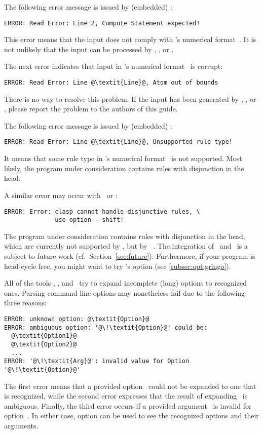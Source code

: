 The following error message is issued by (embedded) \clasp:
%
\begin{lstlisting}[numbers=none,escapechar=@]
ERROR: Read Error: Line 2, Compute Statement expected!
\end{lstlisting}
%
This error means that the input does not comply with \lparse's
numerical format~\cite{lparseManual}.
It is not unlikely that the input can be processed
by \gringo, \clingo, or \iclingo.

The next error indicates that input in
\lparse's numerical format~\cite{lparseManual} is corrupt:
%
\begin{lstlisting}[numbers=none,escapechar=@]
ERROR: Read Error: Line @\textit{Line}@, Atom out of bounds
\end{lstlisting}
%
There is no way to resolve this problem.
If the input has been generated by \gringo, \clingo, or \iclingo,
please report the problem to the authors of this guide.

The following error message is issued by (embedded) \clasp:
%
\begin{lstlisting}[numbers=none,escapechar=@]
ERROR: Read Error: Line @\textit{Line}@, Unsupported rule type!
\end{lstlisting}
%
It means that some rule type in \lparse's
numerical format~\cite{lparseManual} is not supported.
Most likely, the program under consideration contains
rules with disjunction in the head.

A similar error may occur with \clingo\ or \iclingo:
%
\begin{lstlisting}[numbers=none,escapechar=@]
ERROR: Error: clasp cannot handle disjunctive rules, \
              use option --shift!
\end{lstlisting}
%
The program under consideration contains rules with disjunction in the head,
which are currently not supported by \clasp,
but by \claspD~\cite{drgegrkakoossc08a}.
The integration of \clasp\ and \claspD\ is a subject to future work
(cf.\ Section~\ref{sec:future}).
Furthermore, if your program is head-cycle free, 
you might want to try \gringo's  option (see \ref{subsec:opt:gringo}).

All of the tools \gringo, \clasp, and \clingo\
try to expand incomplete (long) options to recognized ones.
Parsing command line options may nonetheless fail due to the following three reasons:
%
\begin{lstlisting}[numbers=none,escapechar=@]
ERROR: unknown option: @\textit{Option}@
ERROR: ambiguous option: '@\!\textit{Option}@' could be:
  @\textit{Option1}@
  @\textit{Option2}@
  ...
ERROR: '@\!\textit{Arg}@': invalid value for Option '@\!\textit{Option}@'
\end{lstlisting}
%
The first error means that a provided option~
could not be expanded to one that is recognized,
while the second error expresses that the result of expanding~
is ambiguous.
Finally, the third error occurs if a provided argument~\code{\textit{Arg}}
is invalid for option~.
In either case, option \code{--help} can be used to see 
the recognized options and their arguments.


